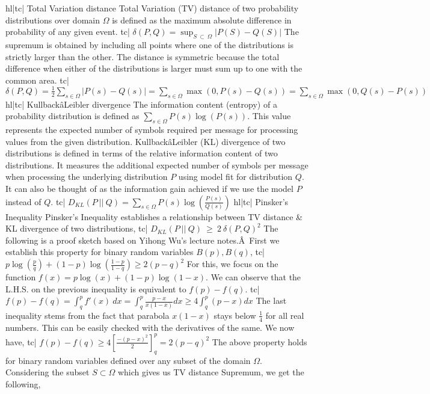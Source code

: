 hl|tc| Total Variation distance
Total Variation (TV) distance of two probability distributions over domain \(\Omega\) is defined as the maximum absolute difference in probability of any given event.
tc| \( \delta(P, Q) = \sup_{S \ \subset \ \Omega} | P(S) - Q(S) | \)
The supremum is obtained by including all points where one of the distributions is strictly larger than the other. The distance is symmetric because the total difference when either of the distributions is larger must sum up to one with the common area.
tc| \( \delta(P, Q) = \frac{1}{2} \sum_{s \in \Omega} |P(s) - Q(s)| = \sum_{s \in \Omega} \max(0, P(s) - Q(s)) = \sum_{s \in \Omega} \max(0, Q(s) - P(s)) \)
hl|tc| KullbackâLeibler divergence
The information content (entropy) of a probability distribution is defined as \( \sum_{s \in \Omega} P(s) \log(P(s)) \). This value represents the expected number of symbols required per message for processing values from the given distribution.
KullbackâLeibler (KL) divergence of two distributions is defined in terms of the relative information content of two distributions. It measures the additional expected number of symbols per message when processing the underlying distribution \(P\) using model fit for distribution \(Q\). It can also be thought of as the information gain achieved if we use the model \(P\) instead of \(Q\).
tc| \( D_{KL} (P \ || \ Q) = \sum_{s \in \Omega} P(s) \log \left(\frac{P(s)}{Q(s)}\right) \)
hl|tc| Pinsker's Inequality
Pinsker's Inequality establishes a relationship between TV distance & KL divergence of two distributions,
tc| \( D_{KL} (P \ || \ Q) \ \ge \ 2 \ \delta(P, Q)^2 \)
The following is a proof sketch based on Yihong Wu's lecture notes.Â First we establish this property for binary random variables \( B(p), B(q) \),
tc| \( p \log{ \left( \frac{p}{q} \right) } + (1-p) \log{ \left( \frac{1-p}{1-q} \right) \ge 2(p-q)^2 } \)
For this, we focus on the function \( f(x) = p \log (x) + (1 - p) \log (1 - x) \). We can observe that the L.H.S. on the previous inequality is equivalent to \( f(p) - f(q) \).
tc| \( f(p) - f(q) = \int_q^p f'(x) \ dx = \int_q^p \frac{p - x}{x (1 - x)} dx \ge 4 \int_q^p (p - x) dx \)
The last inequality stems from the fact that parabola \( x (1-x) \) stays below \( \frac{1}{4} \) for all real numbers. This can be easily checked with the derivatives of the same. We now have,
tc| \( f(p) - f(q) \ge 4 \left[ \frac{-(p-x)^2}{2} \right]_q^p = 2 (p - q)^2 \)
The above property holds for binary random variables defined over any subset of the domain \( \Omega \). Considering the subset \( S \subset \Omega \) which gives us TV distance Supremum, we get the following,

